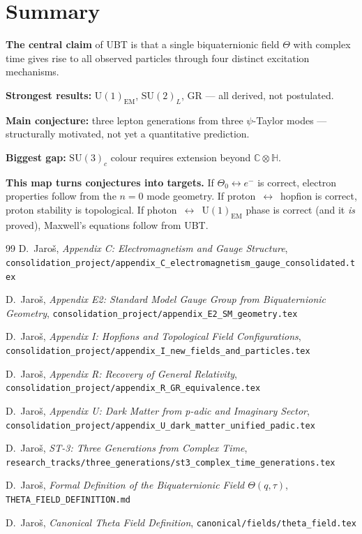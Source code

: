 \documentclass[12pt,a4paper]{article}
\theoremstyle{remark}
\newcommand{\C}{\mathbb{C}}
\newcommand{\H}{\mathbb{H}}
\begin{document}
\section*{Summary}

\noindent\textbf{The central claim} of UBT is that a single biquaternionic
field $\Theta$ with complex time gives rise to all observed particles through
four distinct excitation mechanisms.

\noindent\textbf{Strongest results:} $\mathrm{U}(1)_{\mathrm{EM}}$,
$\mathrm{SU}(2)_L$, GR — all derived, not postulated.

\noindent\textbf{Main conjecture:} three lepton generations from three
$\psi$-Taylor modes — structurally motivated, not yet a quantitative
prediction.

\noindent\textbf{Biggest gap:} $\mathrm{SU}(3)_c$ colour requires extension
beyond $\C\otimes\H$.

\noindent\textbf{This map turns conjectures into targets.} If
$\Theta_0\leftrightarrow e^-$ is correct, electron properties follow from
the $n=0$ mode geometry.  If proton~$\leftrightarrow$~hopfion is correct,
proton stability is topological.  If photon~$\leftrightarrow$~$\mathrm{U}(1)_{\mathrm{EM}}$
phase is correct (and it \emph{is} proved), Maxwell's equations follow from
UBT.

\begin{thebibliography}{99}
  D.~Jaro\v{s}, \textit{Appendix C: Electromagnetism and Gauge Structure},
  \texttt{consolidation\_project/appendix\_C\_electromagnetism\_gauge\_consolidated.tex}

  D.~Jaro\v{s}, \textit{Appendix E2: Standard Model Gauge Group from
  Biquaternionic Geometry},
  \texttt{consolidation\_project/appendix\_E2\_SM\_geometry.tex}

  D.~Jaro\v{s}, \textit{Appendix I: Hopfions and Topological Field
  Configurations},
  \texttt{consolidation\_project/appendix\_I\_new\_fields\_and\_particles.tex}

  D.~Jaro\v{s}, \textit{Appendix R: Recovery of General Relativity},
  \texttt{consolidation\_project/appendix\_R\_GR\_equivalence.tex}

  D.~Jaro\v{s}, \textit{Appendix U: Dark Matter from p-adic and Imaginary
  Sector},
  \texttt{consolidation\_project/appendix\_U\_dark\_matter\_unified\_padic.tex}

  D.~Jaro\v{s}, \textit{ST-3: Three Generations from Complex Time},
  \texttt{research\_tracks/three\_generations/st3\_complex\_time\_generations.tex}

  D.~Jaro\v{s}, \textit{Formal Definition of the Biquaternionic Field
  $\Theta(q,\tau)$},
  \texttt{THETA\_FIELD\_DEFINITION.md}

  D.~Jaro\v{s}, \textit{Canonical Theta Field Definition},
  \texttt{canonical/fields/theta\_field.tex}
\end{thebibliography}
\end{document}
